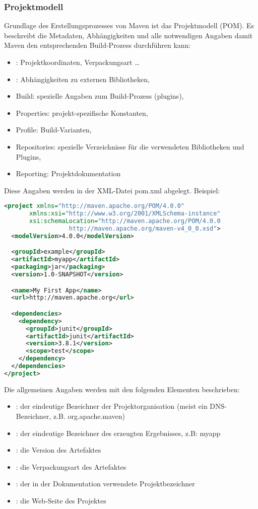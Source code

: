\subsubsection{Projektmodell}
Grundlage des Erstellungsprozesses von Maven ist das Projektmodell (POM).
Es beschreibt die Metadaten, Abhängigkeiten und alle notwendigen
Angaben damit Maven den entsprechenden Build-Prozess
durchführen kann:
\begin{itemize}
\item {}: Projektkoordinaten, Verpackungsart \ldots
\item {}: Abhängigkeiten zu externen Bibliotheken,
\item Build: spezielle Angaben zum Build-Prozess (plugins),
\item Properties: projekt-spezifische Konstanten,
\item Profile: Build-Varianten,
\item Repositories: spezielle Verzeichnisse für die verwendeten
  Bibliotheken und Plugins,
\item Reporting: Projektdokumentation
\end{itemize}
Diese Angaben werden in der XML-Datei pom.xml abgelegt. Beispiel:
\begin{lstlisting}[language=xml,
   morekeywords={modelVersion,groupId,artifactId,
   packaging,version,name,url,dependencies,dependency,scope,project}]
  <project xmlns="http://maven.apache.org/POM/4.0.0"
       xmlns:xsi="http://www.w3.org/2001/XMLSchema-instance"
       xsi:schemaLocation="http://maven.apache.org/POM/4.0.0
                  http://maven.apache.org/maven-v4_0_0.xsd">
  <modelVersion>4.0.0</modelVersion>

  <groupId>example</groupId>
  <artifactId>myapp</artifactId>
  <packaging>jar</packaging>
  <version>1.0-SNAPSHOT</version>

  <name>My First App</name>
  <url>http://maven.apache.org</url>

  <dependencies>
    <dependency>
      <groupId>junit</groupId>
      <artifactId>junit</artifactId>
      <version>3.8.1</version>
      <scope>test</scope>
    </dependency>
  </dependencies>
</project>
\end{lstlisting}
\newslide
Die allgemeinen Angaben werden mit den folgenden Elementen beschrieben:
\begin{itemize}
\item {}: der eindeutige Bezeichner der Projektorganisation
  (meist ein DNS-Bezeichner, z.B. org.apache.maven)
\item {}: der eindeutige Bezeichner des erzeugten
  Ergebnisses, z.B: myapp
\item {}: die Version des Artefaktes
\item {}: die Verpackungsart des Artefaktes
\item {}: der in der Dokumentation verwendete Projektbezeichner
\item {}: die Web-Seite des Projektes
\end{itemize}
